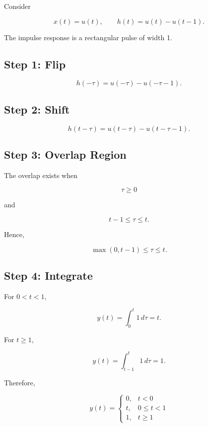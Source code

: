 Consider

\[
x(t)=u(t),
\qquad
h(t)=u(t)-u(t-1).
\]

The impulse response is a rectangular pulse of width 1.


\subsection{Step 1: Flip}

\[
h(-\tau)=u(-\tau)-u(-\tau-1).
\]


\subsection{Step 2: Shift}

\[
h(t-\tau)=u(t-\tau)-u(t-\tau-1).
\]


\subsection{Step 3: Overlap Region}

The overlap exists when

\[
\tau\ge0
\]

and

\[
t-1\le\tau\le t.
\]

Hence,

\[
\max(0,t-1)\le\tau\le t.
\]


\subsection{Step 4: Integrate}

For \(0<t<1\),

\[
y(t)=\int_0^t 1\,d\tau=t.
\]

For \(t\ge1\),

\[
y(t)=\int_{t-1}^{t}1\,d\tau=1.
\]

Therefore,

\[
\boxed{
y(t)=
\begin{cases}
0, & t<0\\
t, & 0\le t<1\\
1, & t\ge1
\end{cases}
}
\]

